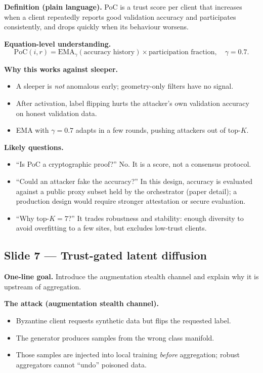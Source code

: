 \documentclass[11pt,a4paper]{article}
\begin{document}
\textbf{Definition (plain language).}
PoC is a trust score per client that increases when a client repeatedly reports good validation accuracy and participates consistently, and drops quickly when its behaviour worsens.

\textbf{Equation-level understanding.}
\[
\mathrm{PoC}(i,r)=\mathrm{EMA}_\gamma(\text{accuracy history})\times\text{participation fraction},\quad \gamma=0.7.
\]

\textbf{Why this works against sleeper.}
\begin{itemize}
\item A sleeper is \emph{not} anomalous early; geometry-only filters have no signal.
\item After activation, label flipping hurts the attacker’s own validation accuracy on honest validation data.
\item EMA with $\gamma=0.7$ adapts in a few rounds, pushing attackers out of top-$K$.
\end{itemize}

\textbf{Likely questions.}
\begin{itemize}
\item ``Is PoC a cryptographic proof?'' No. It is a score, not a consensus protocol.
\item ``Could an attacker fake the accuracy?'' In this design, accuracy is evaluated against a public proxy subset held by the orchestrator (paper detail); a production design would require stronger attestation or secure evaluation.
\item ``Why top-$K=7$?'' It trades robustness and stability: enough diversity to avoid overfitting to a few sites, but excludes low-trust clients.
\end{itemize}

\subsection{Slide 7 --- Trust-gated latent diffusion}
\textbf{One-line goal.} Introduce the augmentation stealth channel and explain why it is upstream of aggregation.

\textbf{The attack (augmentation stealth channel).}
\begin{itemize}
\item Byzantine client requests synthetic data but flips the requested label.
\item The generator produces samples from the wrong class manifold.
\item Those samples are injected into local training \emph{before} aggregation; robust aggregators cannot ``undo'' poisoned data.
\end{itemize}
\end{document}
